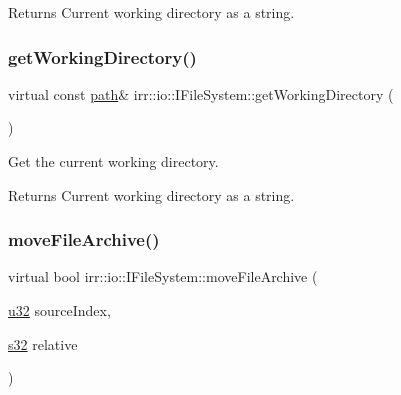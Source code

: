 \begin{DoxyReturn}{Returns}
Current working directory as a string. 
\end{DoxyReturn}
\mbox{\label{classirr_1_1io_1_1IFileSystem_acbf7342afa6e2fc9583db3e521e66e61}} 
\subsubsection{\texorpdfstring{get\+Working\+Directory()}{getWorkingDirectory()}\hspace{0.1cm}{\footnotesize\ttfamily [2/2]}}
{\footnotesize\ttfamily virtual const \hyperlink{namespaceirr_1_1io_a6468281622ce3a1c46b72e19f32dded5}{path}\& irr\+::io\+::\+I\+File\+System\+::get\+Working\+Directory (\begin{DoxyParamCaption}{ }\end{DoxyParamCaption})\hspace{0.3cm}{\ttfamily [pure virtual]}}



Get the current working directory. 

\begin{DoxyReturn}{Returns}
Current working directory as a string. 
\end{DoxyReturn}
\mbox{\label{classirr_1_1io_1_1IFileSystem_ae8530fb9793373cf4dbee956090e99f6}} 
\subsubsection{\texorpdfstring{move\+File\+Archive()}{moveFileArchive()}\hspace{0.1cm}{\footnotesize\ttfamily [1/2]}}
{\footnotesize\ttfamily virtual bool irr\+::io\+::\+I\+File\+System\+::move\+File\+Archive (\begin{DoxyParamCaption}\item[{\hyperlink{namespaceirr_a0416a53257075833e7002efd0a18e804}{u32}}]{source\+Index,  }\item[{\hyperlink{namespaceirr_ac66849b7a6ed16e30ebede579f9b47c6}{s32}}]{relative }\end{DoxyParamCaption})\hspace{0.3cm}{\ttfamily [pure virtual]}}



